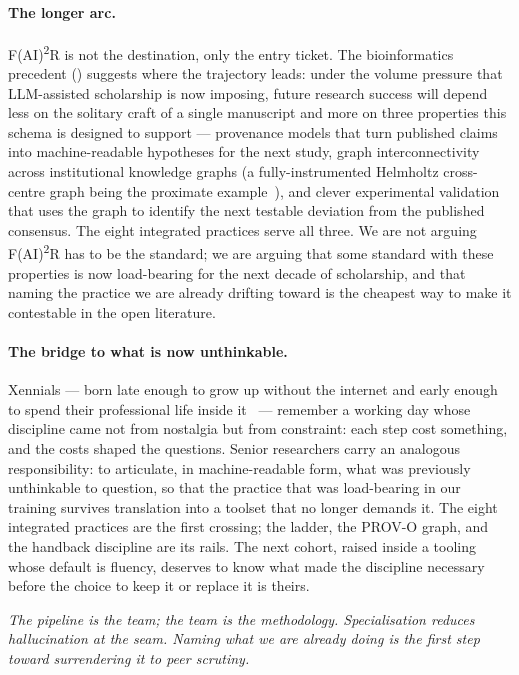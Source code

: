 \paragraph{The longer arc.}
F(AI)\textsuperscript{2}R is not the destination, only the entry
ticket. The bioinformatics precedent
() suggests where the
trajectory leads: under the volume pressure that
LLM-assisted scholarship is now imposing, future research success
will depend less on the solitary craft of a single manuscript and
more on three properties this schema is designed to support ---
provenance models that turn published claims into machine-readable
hypotheses for the next study, graph interconnectivity across
institutional knowledge graphs (a fully-instrumented Helmholtz
cross-centre graph being the proximate
example~\cite{curdt2025hmc}), and clever experimental validation
that uses the graph to identify the next testable deviation from
the published consensus. The eight integrated practices serve all
three. We are not arguing F(AI)\textsuperscript{2}R has to be the
standard; we are arguing that some standard with these properties
is now load-bearing for the next decade of scholarship, and that
naming the practice we are already drifting toward is the cheapest
way to make it contestable in the open literature.

\paragraph{The bridge to what is now unthinkable.}
Xennials --- born late enough to grow up without the internet and
early enough to spend their professional life inside
it~\cite{shafer2014xennials} --- remember a
working day whose discipline came not from nostalgia but from
constraint: each step cost something, and the costs shaped the
questions. Senior researchers carry an analogous responsibility:
to articulate, in machine-readable form, what was previously
unthinkable to question, so that the practice that was
load-bearing in our training survives translation into a toolset
that no longer demands it. The eight integrated practices are
the first crossing; the ladder, the PROV-O graph, and the
handback discipline are its rails. The next cohort, raised inside
a tooling whose default is fluency, deserves to know what made
the discipline necessary before the choice to keep it or replace
it is theirs.

\bigskip
\noindent \emph{The pipeline is the team; the team is the
methodology. Specialisation reduces hallucination at the seam.
Naming what we are already doing is the first step toward
surrendering it to peer scrutiny.}
